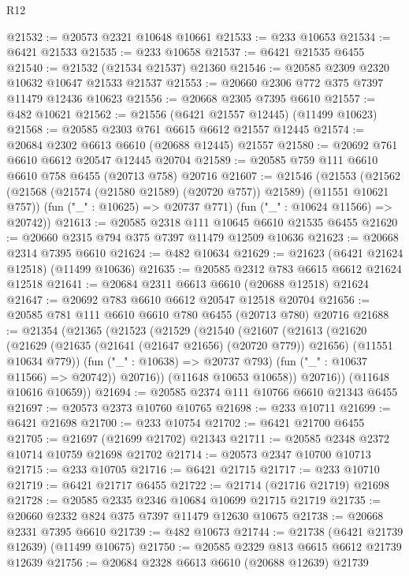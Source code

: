 \begin{lexlean}{R12}
\begin{coremodule}
{{{{{{{{{{{{{{{{{{{{{{{{{{{{{{{{{{{{{{{{{{{{{{{{{{{{{{{{{{{{{{{{{{{{{{{{{{{{{{{{{{@21532 := @20573 @2321 @10648 @10661
@21533 := @233 @10653
@21534 := @6421 @21533
@21535 := @233 @10658
@21537 := @6421 @21535 @6455
@21540 := @21532 (@21534 @21537) @21360
@21546 := @20585 @2309 @2320 @10632 @10647 @21533 @21537
@21553 := @20660 @2306 @772 @375 @7397 @11479 @12436 @10623
@21556 := @20668 @2305 @7395 @6610
@21557 := @482 @10621
@21562 := @21556 (@6421 @21557 @12445) (@11499 @10623)
@21568 := @20585 @2303 @761 @6615 @6612 @21557 @12445
@21574 := @20684 @2302 @6613 @6610 (@20688 @12445) @21557
@21580 := @20692 @761 @6610 @6612 @20547 @12445 @20704
@21589 := @20585 @759 @111 @6610 @6610 @758 @6455 (@20713 @758) @20716
@21607 := @21546
    (@21553
      (@21562 (@21568 (@21574 (@21580 @21589) (@20720 @757)) @21589) (@11551 @10621 @757))
      (fun ("_" : @10625) => @20737 @771)
      (fun ("_" : @10624 @11566) => @20742))
@21613 := @20585 @2318 @111 @10645 @6610 @21535 @6455
@21620 := @20660 @2315 @794 @375 @7397 @11479 @12509 @10636
@21623 := @20668 @2314 @7395 @6610
@21624 := @482 @10634
@21629 := @21623 (@6421 @21624 @12518) (@11499 @10636)
@21635 := @20585 @2312 @783 @6615 @6612 @21624 @12518
@21641 := @20684 @2311 @6613 @6610 (@20688 @12518) @21624
@21647 := @20692 @783 @6610 @6612 @20547 @12518 @20704
@21656 := @20585 @781 @111 @6610 @6610 @780 @6455 (@20713 @780) @20716
@21688 := @21354
    (@21365
      (@21523
        (@21529
          (@21540
            (@21607
              (@21613
                (@21620
                  (@21629
                    (@21635 (@21641 (@21647 @21656) (@20720 @779)) @21656)
                    (@11551 @10634 @779))
                  (fun ("_" : @10638) => @20737 @793)
                  (fun ("_" : @10637 @11566) => @20742))
                @20716))
            (@11648 @10653 @10658))
          @20716))
      (@11648 @10616 @10659))
@21694 := @20585 @2374 @111 @10766 @6610 @21343 @6455
@21697 := @20573 @2373 @10760 @10765
@21698 := @233 @10711
@21699 := @6421 @21698
@21700 := @233 @10754
@21702 := @6421 @21700 @6455
@21705 := @21697 (@21699 @21702) @21343
@21711 := @20585 @2348 @2372 @10714 @10759 @21698 @21702
@21714 := @20573 @2347 @10700 @10713
@21715 := @233 @10705
@21716 := @6421 @21715
@21717 := @233 @10710
@21719 := @6421 @21717 @6455
@21722 := @21714 (@21716 @21719) @21698
@21728 := @20585 @2335 @2346 @10684 @10699 @21715 @21719
@21735 := @20660 @2332 @824 @375 @7397 @11479 @12630 @10675
@21738 := @20668 @2331 @7395 @6610
@21739 := @482 @10673
@21744 := @21738 (@6421 @21739 @12639) (@11499 @10675)
@21750 := @20585 @2329 @813 @6615 @6612 @21739 @12639
@21756 := @20684 @2328 @6613 @6610 (@20688 @12639) @21739
}}}}}}}}}}}}}}}}}}}}}}}}}}}}}}}}}}}}}}}}}}}}}}}}}}}}}}}}}}}}}}}}}}}}}}}}}}}}}}}}}}
\end{coremodule}
\end{lexlean}
